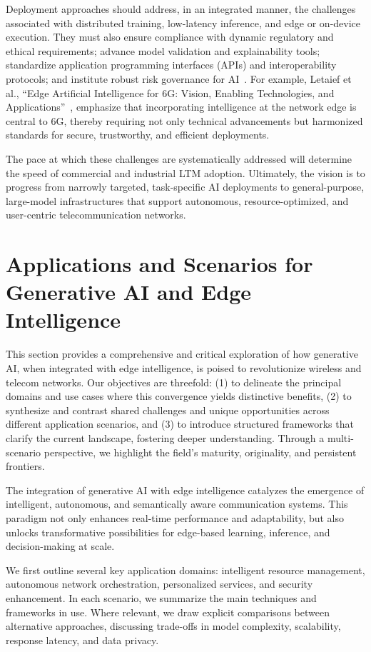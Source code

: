 \documentclass[sigconf]{acmart}
\begin{document}
Deployment approaches should address, in an integrated manner, the challenges associated with distributed training, low-latency inference, and edge or on-device execution. They must also ensure compliance with dynamic regulatory and ethical requirements; advance model validation and explainability tools; standardize application programming interfaces (APIs) and interoperability protocols; and institute robust risk governance for AI~\cite{ref46,ref49}. For example, Letaief et al., ``Edge Artificial Intelligence for 6G: Vision, Enabling Technologies, and Applications''~\cite{ref49}, emphasize that incorporating intelligence at the network edge is central to 6G, thereby requiring not only technical advancements but harmonized standards for secure, trustworthy, and efficient deployments.

The pace at which these challenges are systematically addressed will determine the speed of commercial and industrial LTM adoption. Ultimately, the vision is to progress from narrowly targeted, task-specific AI deployments to general-purpose, large-model infrastructures that support autonomous, resource-optimized, and user-centric telecommunication networks.

\section{Applications and Scenarios for Generative AI and Edge Intelligence}

This section provides a comprehensive and critical exploration of how generative AI, when integrated with edge intelligence, is poised to revolutionize wireless and telecom networks. Our objectives are threefold: (1) to delineate the principal domains and use cases where this convergence yields distinctive benefits, (2) to synthesize and contrast shared challenges and unique opportunities across different application scenarios, and (3) to introduce structured frameworks that clarify the current landscape, fostering deeper understanding. Through a multi-scenario perspective, we highlight the field's maturity, originality, and persistent frontiers.

The integration of generative AI with edge intelligence catalyzes the emergence of intelligent, autonomous, and semantically aware communication systems. This paradigm not only enhances real-time performance and adaptability, but also unlocks transformative possibilities for edge-based learning, inference, and decision-making at scale.

We first outline several key application domains: intelligent resource management, autonomous network orchestration, personalized services, and security enhancement. In each scenario, we summarize the main techniques and frameworks in use. Where relevant, we draw explicit comparisons between alternative approaches, discussing trade-offs in model complexity, scalability, response latency, and data privacy.
\end{document}
